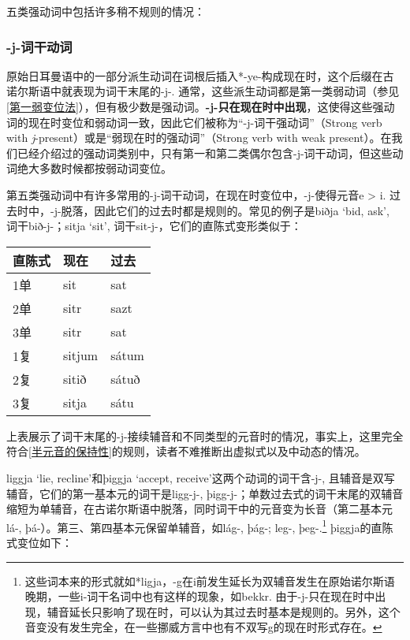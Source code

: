 五类强动词中包括许多稍不规则的情况：

\subsubsection{-j-词干动词}

原始日耳曼语中的一部分派生动词在词根后插入*-ye-构成现在时，这个后缀在古诺尔斯语中就表现为词干末尾的-j-. 通常，这些派生动词都是第一类弱动词（参见\ref{第一弱变位法}），但有极少数是强动词。\textbf{-j-只在现在时中出现}，这使得这些强动词的现在时变位和弱动词一致，因此它们被称为“-j-词干强动词”（Strong verb with \textit{j}-present）或是“弱现在时的强动词”（Strong verb with weak present）。在我们已经介绍过的强动词类别中，只有第一和第二类偶尔包含-j-词干动词，但这些动词绝大多数时候都按弱动词变位。

第五类强动词中有许多常用的-j-词干动词，在现在时变位中，-j-使得元音e > i. 过去时中，-j-脱落，因此它们的过去时都是规则的。常见的例子是biðja `bid, ask‌', 词干bið-j-；sitja `sit‌', 词干sit-j-，它们的直陈式变形类似于：

\begin{longtable}{lll}
    \toprule
    直陈式 & 现在     & 过去    \\
    \midrule
    \endhead
    \bottomrule
    \endfoot
    1单  & sit    & sat   \\
    2单  & sitr   & sazt  \\
    3单  & sitr   & sat   \\
    1复  & sitjum & sátum \\
    2复  & sitið  & sátuð \\
    3复  & sitja  & sátu  \\
\end{longtable}

上表展示了词干末尾的-j-接续辅音和不同类型的元音时的情况，事实上，这里完全符合\ref{半元音的保持性}的规则，读者不难推断出虚拟式以及中动态的情况。

liggja `lie, recline‌'和þiggja `accept, receive‌'这两个动词的词干含-j-, 且辅音是双写辅音，它们的第一基本元的词干是ligg-j-, þigg-j-；单数过去式的词干末尾的双辅音缩短为单辅音，在古诺尔斯语中脱落，同时词干中的元音变为长音（第二基本元lá-, þá-）。第三、第四基本元保留单辅音，如lág-, þág-; leg-, þeg-.\footnote{这些词本来的形式就如*ligja，-g在i前发生延长为双辅音发生在原始诺尔斯语晚期，一些i-词干名词中也有这样的现象，如bekkr. 由于-j-只在现在时中出现，辅音延长只影响了现在时，可以认为其过去时基本是规则的。另外，这个音变没有发生完全，在一些挪威方言中也有不双写g的现在时形式存在。}
þiggja的直陈式变位如下：

